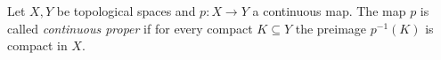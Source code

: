 \documentclass[12pt]{article}
\def\sse{\subseteq}
\begin{document}
Let $X, Y$ be topological spaces and $p\colon X\to Y$ a continuous map.
The map $p$ is called \emph{continuous proper} if for every compact $K\sse Y$
the preimage $p^{-1}(K)$ is compact in $X$.
\end{document}
